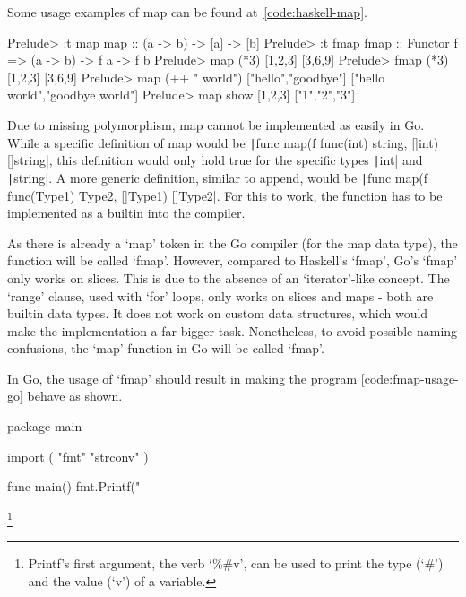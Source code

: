Some usage examples of map can be found at~\ref{code:haskell-map}.

\begin{code}
    \label{code:haskell-map}
    \begin{haskellcode}
Prelude> :t map
map :: (a -> b) -> [a] -> [b]
Prelude> :t fmap
fmap :: Functor f => (a -> b) -> f a -> f b
Prelude> map (*3) [1,2,3]
[3,6,9]
Prelude> fmap (*3) [1,2,3]
[3,6,9]
Prelude> map (++ " world") ["hello","goodbye"]
["hello world","goodbye world"]
Prelude> map show [1,2,3]
["1","2","3"]
    \end{haskellcode}
\end{code}
Due to missing polymorphism, map cannot be implemented as easily in Go. While
a specific definition of map would be
\texttt|func map(f func(int) string, []int) []string|,
this definition would only hold true for the specific types \texttt|int|
and \texttt|string|. A more generic definition, similar to append,
would be \texttt|func map(f func(Type1) Type2, []Type1) []Type2|. For
this to work, the function has to be implemented as a builtin into the compiler.

As there is already a `map' token in the Go compiler (for the map data type),
the function will be called `fmap'. However, compared to Haskell's `fmap',
Go's `fmap' only works on slices. This is due
to the absence of an `iterator'-like concept. The `range' clause, used with
`for' loops, only works on slices and maps - both are builtin data types. It does
not work on custom data structures, which would make the implementation a far
bigger task.
Nonetheless, to avoid possible naming confusions, the `map' function in Go will
be called `fmap'.

In Go, the usage of `fmap' should result in making the program \ref{code:fmap-usage-go}
behave as shown.

\begin{code}
    \label{code:fmap-usage-go}
    \begin{gocode}
package main

import (
  "fmt"
  "strconv"
)

func main() {
  fmt.Printf("%
}
\end{gocode}
\footnote{Printf's first argument, the verb `\%\#v', can be used to print the type
(`\#') and the value (`v') of a variable\autocite{fmt-godoc}.}
\end{code}
